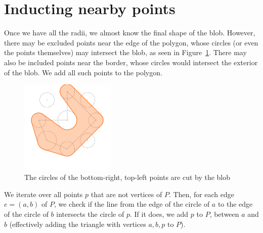 \documentclass[paper=a4, fontsize=11pt]{scrartcl} %
\numberwithin{equation}{section} %
\numberwithin{figure}{section} %
\numberwithin{table}{section} %
\begin{document}
\section{Inducting nearby points}
Once we have all the radii, we almost know the final shape of the blob. However,
there may be excluded points near the edge of the polygon, whose circles (or
even the points themselves) may intersect the blob, as seen in
Figure~\ref{fig:whyrefine}. There may also be included points near the border,
whose circles would intersect the exterior of the blob.  We add all such points
to the polygon. \\

\begin{figure}[h]
\includegraphics[width=0.4\textwidth]{whyrefine}
\centering
\caption{The circles of the bottom-right, top-left points are cut by the blob}
\label{fig:whyrefine}
\end{figure}

We iterate over all points $p$ that are not vertices of $P$. Then, for each edge
$e = (a,b)$ of $P$, we check if the line from the edge of the circle of $a$ to
the edge of the circle of $b$ intersects the circle of $p$. If it does, we add
$p$ to $P$, between $a$ and $b$ (effectively adding the triangle with vertices
$a,b,p$ to $P$). \\
\end{document}

